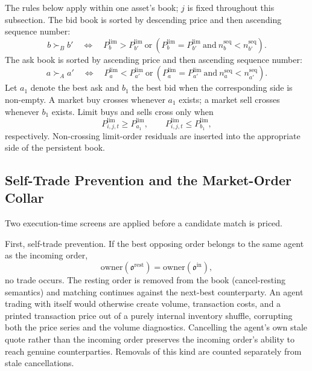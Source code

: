 \documentclass[12pt, a4paper]{article}
\begin{document}
    The rules below apply within one asset's book; \(j\) is fixed throughout this
    subsection. The bid book is sorted by descending price and then ascending
    sequence number:
    \[
        b\succ_B b'
        \quad\Longleftrightarrow\quad
        P_b^{\text{lim}}>P_{b'}^{\text{lim}}
        \ \text{or}\
        \left(P_b^{\text{lim}}=P_{b'}^{\text{lim}}
            \ \text{and}\ n_b^{\mathrm{seq}}<n_{b'}^{\mathrm{seq}}\right).
    \]
    The ask book is sorted by ascending price and then ascending sequence number:
    \[
        a\succ_A a'
        \quad\Longleftrightarrow\quad
        P_a^{\text{lim}}<P_{a'}^{\text{lim}}
        \ \text{or}\
        \left(P_a^{\text{lim}}=P_{a'}^{\text{lim}}
            \ \text{and}\ n_a^{\mathrm{seq}}<n_{a'}^{\mathrm{seq}}\right).
    \]
    Let \(a_1\) denote the best ask and \(b_1\) the best bid when the corresponding
    side is non-empty. A market buy crosses whenever \(a_1\) exists; a market sell
    crosses whenever \(b_1\) exists. Limit buys and sells cross only when
    \[
        P_{i,j,t}^{\text{lim}}\ge P_{a_1}^{\text{lim}},
        \qquad
        P_{i,j,t}^{\text{lim}}\le P_{b_1}^{\text{lim}},
    \]
    respectively. Non-crossing limit-order residuals are inserted into the
    appropriate side of the persistent book.

    \subsection{Self-Trade Prevention and the Market-Order Collar}\label{sec:stp_collar}

    Two execution-time screens are applied before a candidate match is priced.

    First, self-trade prevention. If the best opposing order belongs to the same
    agent as the incoming order,
    \[
        \mathrm{owner}(\mathfrak{o}^{\mathrm{rest}})
        =
        \mathrm{owner}(\mathfrak{o}^{\mathrm{in}}),
    \]
    no trade occurs. The resting order is removed from the book
    (cancel-resting semantics) and matching continues against the next-best
    counterparty. An agent trading with itself would otherwise create volume,
    transaction costs, and a printed transaction price out of a purely internal
    inventory shuffle, corrupting both the price series and the volume
    diagnostics. Cancelling the agent's own stale quote rather than the incoming
    order preserves the incoming order's ability to reach genuine counterparties.
    Removals of this kind are counted separately from stale cancellations.
\end{document}
